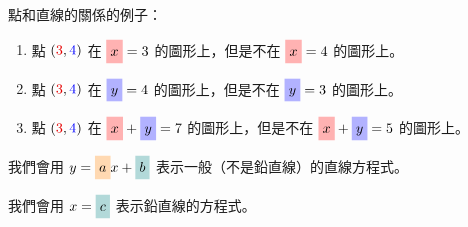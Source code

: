 \documentclass[12pt]{article}
\newcommand{\x}{\colorbox{red!30}{\rule[-.2\baselineskip]{0pt}{.9\baselineskip}$x$}}
\newcommand{\y}{\colorbox{blue!30}{\rule[-.2\baselineskip]{0pt}{.9\baselineskip}$y$}}
\newcommand{\coeffa}{\colorbox{orange!30}{\rule[-.2\baselineskip]{0pt}{.9\baselineskip}$a$}}
\newcommand{\coeffb}{\colorbox{teal!30}{\rule[-.2\baselineskip]{0pt}{.9\baselineskip}$b$}}
\newcommand{\coeffc}{\colorbox{teal!30}{\rule[-.2\baselineskip]{0pt}{.9\baselineskip}$c$}}
\begin{document}
\small
\begin{problem}[label={\Alph*.},widest=A,parsep=0ex]
  \item 點和直線的關係的例子：
  \begin{enumerate}[label=(\arabic*),left=0pt]
    \item 點 $(\textcolor{red!90!black}{3}, \textcolor{blue}{4})$ 在 $\x = 3$ 的圖形上，但是不在 $\x = 4$ 的圖形上。
    \item 點 $(\textcolor{red!90!black}{3}, \textcolor{blue}{4})$ 在 $\y = 4$ 的圖形上，但是不在 $\y = 3$ 的圖形上。
    \item 點 $(\textcolor{red!90!black}{3}, \textcolor{blue}{4})$ 在 $\x + \y = 7$ 的圖形上，但是不在 $\x + \y = 5$ 的圖形上。
  \end{enumerate}
  \item 我們會用 $y = \coeffa x + \coeffb$ 表示一般（不是鉛直線）的直線方程式。
  \item 我們會用 $x = \coeffc$ 表示鉛直線的方程式。
\end{problem}
\end{document}
